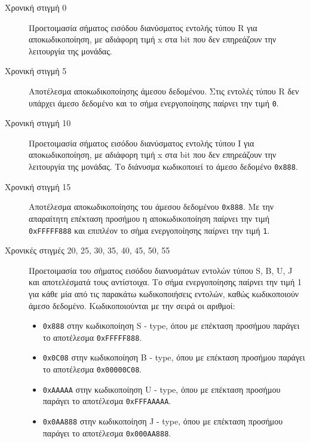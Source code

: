 \documentclass[11pt]{extarticle}
\begin{document}
\begin{description}
\item[Χρονική στιγμή 0] \hfill \newline
Προετοιμασία σήματος εισόδου διανύσματος εντολής τύπου R για αποκωδικοποίηση, με αδιάφορη τιμή x στα bit που δεν επηρεάζουν την λειτουργία της μονάδας.
\item[Χρονική στιγμή 5] \hfill \newline
Αποτέλεσμα αποκωδικοποίησης άμεσου δεδομένου.
Στις εντολές τύπου R δεν υπάρχει άμεσο δεδομένο και το σήμα ενεργοποίησης παίρνει την τιμή \texttt{0}.
\item[Χρονική στιγμή 10] \hfill \newline
Προετοιμασία σήματος εισόδου διανύσματος εντολής τύπου I για αποκωδικοποίηση, με αδιάφορη τιμή x στα bit που δεν επηρεάζουν την λειτουργία της μονάδας.
Το διάνυσμα κωδικοποιεί το άμεσο δεδομένο \texttt{0x888}.
\item[Χρονική στιγμή 15] \hfill \newline
Αποτέλεσμα αποκωδικοποίησης του άμεσου δεδομένου \texttt{0x888}.
Με την απαραίτητη επέκταση προσήμου η αποκωδικοποίηση παίρνει την τιμή \texttt{0xFFFFF888} και επιπλέον το σήμα ενεργοποίησης παίρνει την τιμή \texttt{1}.
\item[Χρονικές στιγμές 20, 25, 30, 35, 40, 45, 50, 55] \hfill \newline
Προετοιμασία του σήματος εισόδου διανυσμάτων εντολών τύπου S, B, U, J και αποτελέσματά τους αντίστοιχα.
Το σήμα ενεργοποίησης παίρνει την τιμή 1 για κάθε μία από τις παρακάτω κωδικοποιήσεις εντολών, καθώς κωδικοποιούν άμεσο δεδομένο.\newline
Κωδικοποιούνται με την σειρά οι αριθμοί:
\begin{itemize}
    \item \texttt{0x888} στην κωδικοποίηση S - type, όπου με επέκταση προσήμου παράγει το αποτέλεσμα \texttt{0xFFFFF888}.
    \item \texttt{0x0C08} στην κωδικοποίηση B - type, όπου με επέκταση προσήμου παράγει το αποτέλεσμα \texttt{0x00000C08}.
    \item \texttt{0xAAAAA} στην κωδικοποίηση U - type, όπου με επέκταση προσήμου παράγει το αποτέλεσμα \texttt{0xFFFAAAAA}.
    \item \texttt{0x0AA888} στην κωδικοποίηση J - type, όπου με επέκταση προσήμου παράγει το αποτέλεσμα \texttt{0x000AA888}.
\end{itemize}
\end{description}
\end{document}
